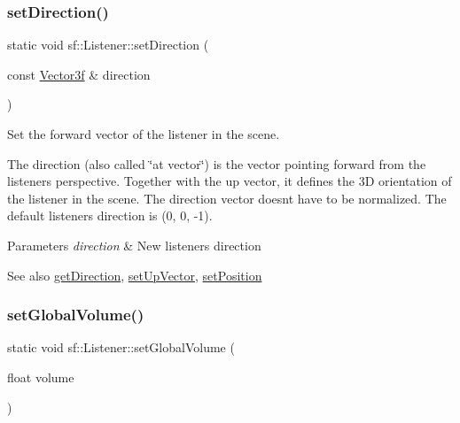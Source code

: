 \subsubsection{\texorpdfstring{setDirection()}{setDirection()}\hspace{0.1cm}{\footnotesize\ttfamily [2/2]}}
{\footnotesize\ttfamily static void sf\+::\+Listener\+::set\+Direction (\begin{DoxyParamCaption}\item[{const \mbox{\hyperlink{classsf_1_1_vector3}{Vector3f}} \&}]{direction }\end{DoxyParamCaption})\hspace{0.3cm}{\ttfamily [static]}}



Set the forward vector of the listener in the scene. 

The direction (also called \char`\"{}at vector\char`\"{}) is the vector pointing forward from the listener\textquotesingle{}s perspective. Together with the up vector, it defines the 3D orientation of the listener in the scene. The direction vector doesn\textquotesingle{}t have to be normalized. The default listener\textquotesingle{}s direction is (0, 0, -\/1).


\begin{DoxyParams}{Parameters}
{\em direction} & New listener\textquotesingle{}s direction\\
\hline
\end{DoxyParams}
\begin{DoxySeeAlso}{See also}
\mbox{\hyperlink{classsf_1_1_listener_a54e91baba51d4431474f53ff7f9309f9}{get\+Direction}}, \mbox{\hyperlink{classsf_1_1_listener_a0ea9b3083a994b2b90253543bc4e3ad6}{set\+Up\+Vector}}, \mbox{\hyperlink{classsf_1_1_listener_a5bc2d8d18ea2d8f339d23cbf17678564}{set\+Position}} \begin{DoxyVerb}\end{DoxyVerb}
 
\end{DoxySeeAlso}
\mbox{\label{classsf_1_1_listener_a803a24a1fc04620cacc9f88c6fbc0e3a}} 
\subsubsection{\texorpdfstring{setGlobalVolume()}{setGlobalVolume()}}
{\footnotesize\ttfamily static void sf\+::\+Listener\+::set\+Global\+Volume (\begin{DoxyParamCaption}\item[{float}]{volume }\end{DoxyParamCaption})\hspace{0.3cm}{\ttfamily [static]}}



